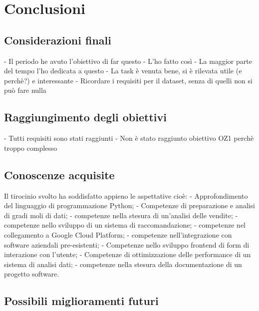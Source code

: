 \chapter{Conclusioni}
\label{cap:conclusioni}


\section{Considerazioni finali}

- Il periodo he avuto l'obiettivo di far questo
- L'ho fatto così
- La maggior parte del tempo l'ho dedicata a questo
- La task è venuta bene, si è rilevata utile (e perchè?) e interessante
- Ricordare i requisiti per il dataset, senza di quelli non si può fare nulla


\section{Raggiungimento degli obiettivi}

- Tutti requisiti sono stati raggiunti
- Non è stato raggiunto obiettivo OZ1 perchè troppo complesso


\section{Conoscenze acquisite}

Il tirocinio svolto ha soddisfatto appieno le aspettative
cioè:
- Approfondimento del linguaggio di programmazione Python;
- Competenze di preparazione e analisi di gradi moli di dati;
- competenze nella stesura di un'analisi delle vendite;
- competenze nello sviluppo di un sistema di raccomandazione;
- competenze nel collegamento a Google Cloud Platform;
- competenze nell'integrazione con software aziendali pre-esistenti;
- Competenze nello sviluppo frontend di form di interazione con l'utente;
- Competenze di ottimizzazione delle performance di un sistema di analisi dati;
- competenze nella stesura della documentazione di un progetto software.


\section{Possibili miglioramenti futuri}

